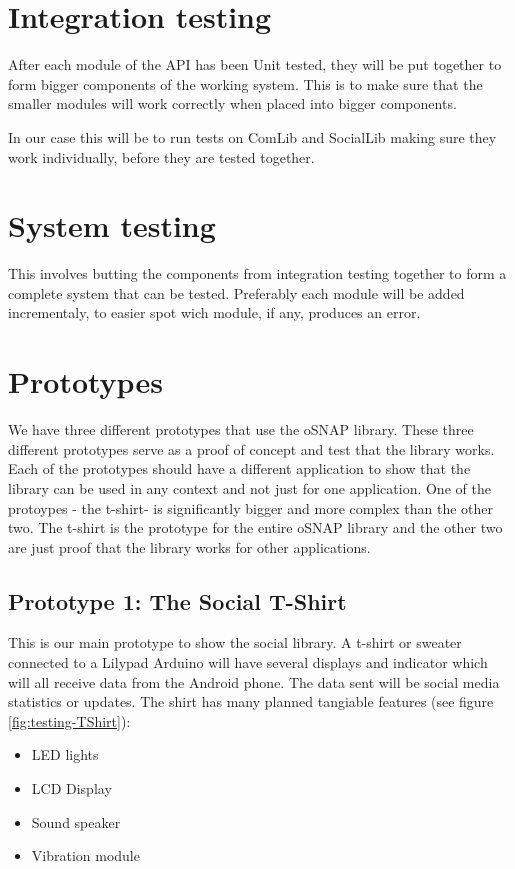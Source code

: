 \section{Integration testing}
After each module of the API has been Unit tested, they will be put together to form bigger components 
of the working system. This is to make sure that the smaller modules will work correctly when placed 
into bigger components. 

In our case this will be to run tests on ComLib and SocialLib making sure they work individually, 
before they are tested together.

\section{System testing}
This involves butting the components from integration testing together to form a complete system that 
can be tested. Preferably each module will be added incrementaly, to easier spot wich module, if any, 
produces an error.

\section{Prototypes}
We have three different prototypes that use the oSNAP library. These three different prototypes serve
as a proof of concept and test that the library works. Each of the prototypes should have a different
application to show that the library can be used in any context and not just for one application. One of
the protoypes - the t-shirt- is significantly bigger and more complex than the other two. The t-shirt
is the prototype for the entire oSNAP library and the other two are just proof that the library works
for other applications.

\subsection{Prototype 1: The Social T-Shirt}
This is our main prototype to show the social library. A t-shirt or sweater connected to a Lilypad Arduino will have
several displays and indicator which will all receive data from the Android phone. The data sent will be social media 
statistics or updates. The shirt has many planned tangiable features (see figure \ref{fig:testing-TShirt}):
\begin{itemize}
\item LED lights
\item LCD Display
\item Sound speaker
\item Vibration module
\end{itemize}

